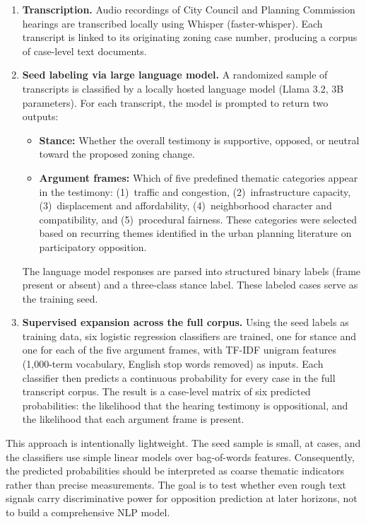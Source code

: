 \documentclass[11pt, letterpaper]{article}
\begin{document}
\begin{enumerate}
    \item \textbf{Transcription.} Audio recordings of City Council and Planning Commission hearings are transcribed locally using Whisper (faster-whisper). Each transcript is linked to its originating zoning case number, producing a corpus of \metricNLPCorpus{} case-level text documents.

    \item \textbf{Seed labeling via large language model.} A randomized sample of \metricNLPSeed{} transcripts is classified by a locally hosted language model (Llama 3.2, 3B parameters). For each transcript, the model is prompted to return two outputs:
    \begin{itemize}
        \item \textbf{Stance:} Whether the overall testimony is supportive, opposed, or neutral toward the proposed zoning change.
        \item \textbf{Argument frames:} Which of five predefined thematic categories appear in the testimony: (1)~traffic and congestion, (2)~infrastructure capacity, (3)~displacement and affordability, (4)~neighborhood character and compatibility, and (5)~procedural fairness. These categories were selected based on recurring themes identified in the urban planning literature on participatory opposition.
    \end{itemize}
    The language model responses are parsed into structured binary labels (frame present or absent) and a three-class stance label. These \metricNLPSeed{} labeled cases serve as the training seed.

    \item \textbf{Supervised expansion across the full corpus.} Using the \metricNLPSeed{} seed labels as training data, six logistic regression classifiers are trained, one for stance and one for each of the five argument frames, with TF-IDF unigram features (1,000-term vocabulary, English stop words removed) as inputs. Each classifier then predicts a continuous probability for every case in the full \metricNLPCorpus{} transcript corpus. The result is a case-level matrix of six predicted probabilities: the likelihood that the hearing testimony is oppositional, and the likelihood that each argument frame is present.
\end{enumerate}

This approach is intentionally lightweight. The seed sample is small, at \metricNLPSeed{} cases, and the classifiers use simple linear models over bag-of-words features. Consequently, the predicted probabilities should be interpreted as coarse thematic indicators rather than precise measurements. The goal is to test whether even rough text signals carry discriminative power for opposition prediction at later horizons, not to build a comprehensive NLP model.
\end{document}
